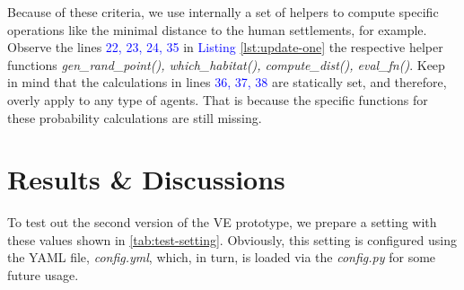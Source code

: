 Because of these criteria, we use internally a set of helpers to compute specific operations like the minimal distance to the human settlements, for example. Observe the lines \textcolor{blue}{22, 23, 24, 35} in \textcolor{blue}{Listing} \ref{lst:update-one} the respective helper functions \emph{gen\_rand\_point(), which\_habitat(), compute\_dist(), eval\_fn()}. Keep in mind that the calculations in lines \textcolor{blue}{36, 37, 38} are statically set, and therefore, overly apply to any type of agents. That is because the specific functions for these probability calculations are still missing.


\section{Results \& Discussions}
To test out the second version of the VE prototype, we prepare a setting with these values shown in \autoref{tab:test-setting}. Obviously, this setting is configured using the YAML file, \emph{config.yml}, which, in turn, is loaded via the \emph{config.py} for some future usage.

